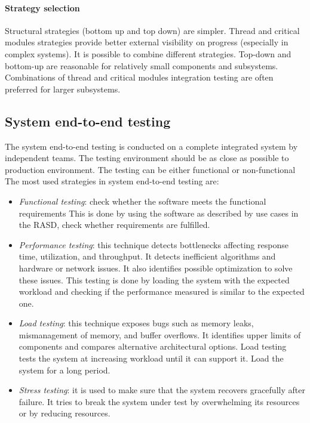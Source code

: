 \paragraph*{Strategy selection}
Structural strategies (bottom up and top down) are simpler. 
Thread and critical modules strategies provide better external visibility on progress (especially in complex systems). 
It is possible to combine different strategies. 
Top-down and bottom-up are reasonable for relatively small components and subsystems.
Combinations of thread and critical modules integration testing are often preferred for larger subsystems.

\subsection{System end-to-end testing}
The system end-to-end testing is conducted on a complete integrated system by independent teams. 
The testing environment should be as close as possible to production environment. 
The testing can be either functional or non-functional
The most used strategies in system end-to-end testing are: 
\begin{itemize}
    \item \textit{Functional testing}: check whether the software meets the functional requirements 
        This is done by using the software as described by use cases in the RASD, check whether requirements are fulfilled. 
    \item \textit{Performance testing}: this technique detects bottlenecks affecting response time, utilization, and throughput. 
        It detects inefficient algorithms and hardware or network issues. 
        It also identifies possible optimization to solve these issues. 
        This testing is done by loading the system with the expected workload and checking if the performance measured is similar to the expected one. 
    \item \textit{Load testing}: this technique exposes bugs such as memory leaks, mismanagement of memory, and buffer overflows. 
        It identifies upper limits of components and compares alternative architectural options. 
        Load testing tests the system at increasing workload until it can support it.  
        Load the system for a long period. 
    \item \textit{Stress testing}: it is used to make sure that the system recovers gracefully after failure.
        It tries to break the system under test by overwhelming its resources or by reducing resources.
\end{itemize}
